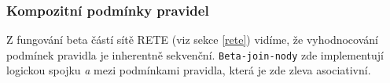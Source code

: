 \subsubsection{Kompozitní podmínky pravidel}
Z fungování beta částí sítě RETE (viz sekce \ref{rete}) vidíme, že vyhodnocování
podmínek pravidla je inherentně sekvenční. \verb|Beta-join-nody| zde
implementují logickou spojku \emph{a} mezi podmínkami pravidla, která je zde
zleva asociativní.
